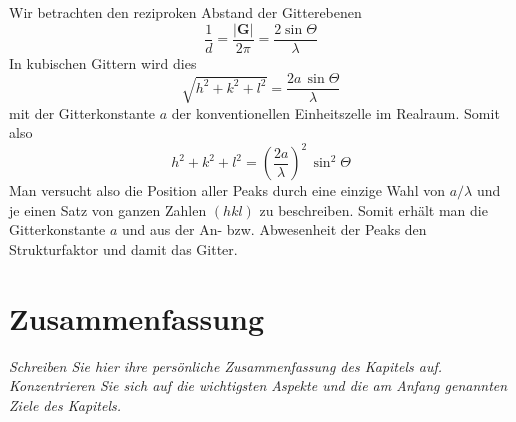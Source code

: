 Wir betrachten den reziproken Abstand der Gitterebenen
\begin{equation}
\frac{1}{d} = \frac{|\mathbf{G}|}{2 \pi} = \frac{2 \sin \Theta}{ \lambda}
\end{equation}
In kubischen Gittern wird dies
\begin{equation}
 \sqrt{h^2 + k^2 + l^2} = \frac{2 a \, \sin \Theta}{ \lambda}
\end{equation}
mit der Gitterkonstante $a$ der konventionellen Einheitszelle im Realraum. Somit also 
\begin{equation}
 h^2 + k^2 + l^2 = \left(\frac{2 a }{ \lambda} \right)^2 \, \sin^2 \Theta
\end{equation}
Man versucht also die Position aller Peaks durch eine einzige Wahl von $a/\lambda$ und je einen Satz von ganzen Zahlen $(hkl)$ zu beschreiben. Somit erhält man die Gitterkonstante $a$ und aus der An- bzw. Abwesenheit der Peaks den Strukturfaktor und damit das Gitter.


 \newpage
\section{Zusammenfassung}

\textit{Schreiben Sie hier ihre persönliche Zusammenfassung des Kapitels auf. Konzentrieren Sie sich auf die wichtigsten Aspekte und die am Anfang genannten Ziele des Kapitels.}

\vspace*{10cm}




\printbibliography[segment=\therefsegment,heading=subbibliography]
